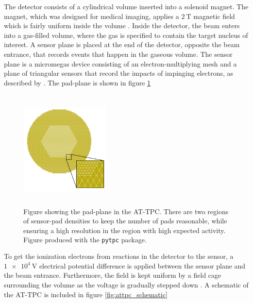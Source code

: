  The detector consists of a cylindrical volume inserted into a solenoid magnet. The magnet, which was designed for medical imaging, applies a $\SI{2}{\tesla}$ magnetic field which is fairly uniform inside the volume \cite{Bradt2017a}. Inside the detector, the beam enters into a gas-filled volume, where the gas is specified to contain the target nucleus of interest. A sensor plane is placed at the end of the detector, opposite the beam entrance, that records events that happen in the gaseous volume. The sensor plane is a micromegas device consisting of an electron-multiplying mesh and a plane of triangular sensors that record the impacts of impinging electrons, as described by \citet{Giomataris1996}. The pad-plane is shown in figure \ref{fig:attpc_padplane}

 \begin{figure}
\centering
\includegraphics[width=0.4\textwidth, height=6cm]{../plots/at_tpc_padplane}
\caption[AT-TPC pad plane]{Figure showing the pad-plane in the AT-TPC. There are two regions of sensor-pad densities to keep the number of pads reasonable, while ensuring a high resolution in the region with high expected activity. Figure produced with the \lstinline{pytpc} package.}\label{fig:attpc_padplane}
 \end{figure}

 To get the ionization electrons from reactions in the detector to the sensor, a $\SI{1e4}{\volt}$ electrical potential difference is applied between the sensor plane and the beam entrance. Furthermore, the field is kept uniform by a field cage surrounding the volume as the voltage is gradually stepped down \cite{Bradt2017a}. A schematic of the AT-TPC is included in figure \ref{fig:attpc_schematic}

